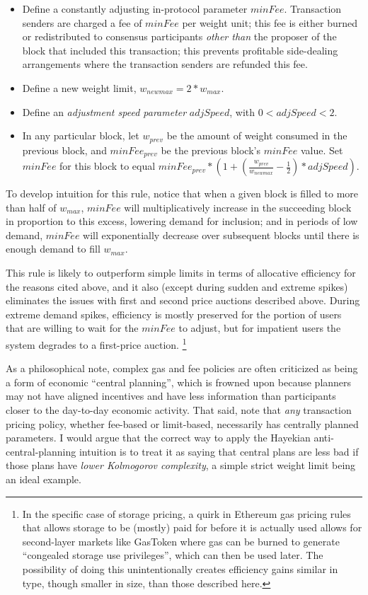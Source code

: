 \documentclass[12pt, final]{article}
\begin{document}
\begin{itemize}
\item Define a constantly adjusting in-protocol parameter $minFee$. Transaction senders are charged a fee of $minFee$ per weight unit; this fee is either burned or redistributed to consensus participants \emph{other than} the proposer of the block that included this transaction; this prevents profitable side-dealing arrangements where the transaction senders are refunded this fee.
\item Define a new weight limit, $w_{newmax} = 2 * w_{max}$.
\item Define an \emph{adjustment speed parameter} $adjSpeed$, with $0 < adjSpeed < 2$.
\item In any particular block, let $w_{prev}$ be the amount of weight consumed in the previous block, and $minFee_{prev}$ be the previous block's $minFee$ value. Set $minFee$ for this block to equal $minFee_{prev} * (1 + (\frac{w_{prev}}{w_{newmax}} - \frac{1}{2}) * adjSpeed)$.
\end{itemize}

To develop intuition for this rule, notice that when a given block is filled to more than half of $w_{max}$, $minFee$ will multiplicatively increase in the succeeding block in proportion to this excess, lowering demand for inclusion; and in periods of low demand, $minFee$ will exponentially decrease over subsequent blocks until there is enough demand to fill $w_{max}$.

This rule is likely to outperform simple limits in terms of allocative efficiency for the reasons cited above, and it also (except during sudden and extreme spikes) eliminates the issues with first and second price auctions described above. During extreme demand spikes, efficiency is mostly preserved for the portion of users that are willing to wait for the $minFee$ to adjust, but for impatient users the system degrades to a first-price auction.  \footnote{In the specific case of storage pricing, a quirk in Ethereum gas pricing rules that allows storage to be (mostly) paid for before it is actually used allows for second-layer markets like GasToken\cite{gastoken} where gas can be burned to generate ``congealed storage use privileges'', which can then be used later. The possibility of doing this unintentionally creates efficiency gains similar in type, though smaller in size, than those described here.}

As a philosophical note, complex gas and fee policies are often criticized as being a form of economic ``central planning'', which is frowned upon because planners may not have aligned incentives and have less information than participants closer to the day-to-day economic activity. That said, note that \emph{any} transaction pricing policy, whether fee-based or limit-based, necessarily has centrally planned parameters. I would argue that the correct way to apply the Hayekian anti-central-planning intuition is to treat it as saying that central plans are less bad if those plans have \emph{lower Kolmogorov complexity}, a simple strict weight limit being an ideal example.
\end{document}
